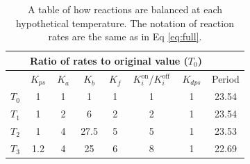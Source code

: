 \documentclass[a4paper,10pt]{article}
\numberwithin{equation}{section}
\begin{document}
\begin{table} 
\centering
 \begin{tabular}{||c||c c c c c c | c||} 
 \hline
 & \multicolumn{6}{|c|}{Ratio of rates to original value ($T_0$)} & \\
 \hline
 & $K_{ps}$ & $K_{a}$ & $K_b$ & $K_f$ & $K_i^{\mathrm {on}}$/$K_i^{\mathrm {off}}$ & $K_{dps}$ & Period\\ [0.5ex] 
 \hline\hline
 $T_0$ & 1 & 1 & 1 & 1  & 1& 1 & 23.54\\ 
 \hline
 $T_1$ & 1 & 2 & 6 & 2 & 2 & 1& 23.54\\
 \hline
 $T_2$ & 1 & 4 & 27.5 & 5 & 5& 1&23.53\\
 \hline
 $T_3$ & 1.2 & 4 & 25 & 6 & 8 & 1 & 22.69\\[1ex] 
 \hline
\end{tabular}
\caption{\selectfont A table of how reactions are balanced at each hypothetical temperature. The notation of reaction rates are the same as in Eq \ref{eq:full}.}
\label{table:temperature}
\end{table}
\end{document}
